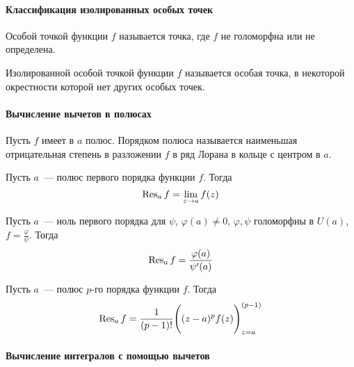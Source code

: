 \documentclass[12pt,timbord]{../../../notes}
\begin{document}
\paragraph{Классификация изолированных особых точек}
\label{par:tfcv::singclass}

\begin{defn}\label{defn:tfcv::singclass::sing}
  Особой точкой функции $f$ называется точка, где $f$ не голоморфна или не определена.
\end{defn}

\begin{defn}\label{defn:tfcv::singclass::isolsing}
  Изолированной особой точкой функции $f$ называется особая точка, в некоторой окрестности которой
  нет других особых точек.
\end{defn}

\setcounter{paragraph}{45}


\paragraph{Вычисление вычетов в полюсах}
\label{par:tfcv::resuduepole}

\begin{defn}\label{defn:tfcv::resuduepole::polord}
  Пусть $f$ имеет в $a$ полюс.
  Порядком полюса называется наименьшая отрицательная степень в разложении $f$ в ряд Лорана в
  кольце с центром в $a$.
\end{defn}

\begin{thrm}\label{thrm:tfcv::resuduepole::firt}
  Пусть $a$~--- полюс первого порядка функции $f$. Тогда
  \[
    \operatorname{Res}_a f =  \lim_{z\to a} f(z)
  \]
\end{thrm}
\begin{thrm}\label{thrm:tfcv::resuduepole::frac}
  Пусть $a$~--- ноль первого порядка для $\psi$, $\varphi(a) \neq 0$, $\varphi, \psi$ голоморфны в
  $U(a)$, $f = \frac{\varphi}{\psi}$. Тогда
  \[
    \operatorname{Res}_a f =  \frac{\varphi(a)}{\psi'(a)}
  \]
\end{thrm}

\begin{thrm}\label{thrm:tfcv::resuduepole::pirt}
  Пусть $a$~--- полюс $p$-го порядка функции $f$. Тогда
  \[
    \operatorname{Res}_a f =  \frac{1}{(p-1)!} \Biggl((z-a)^p f(z)\Biggr)^{(p-1)}_{z=a}
  \]
\end{thrm}

\paragraph{Вычисление интегралов с помощью вычетов}
\label{par:tfcv::intresidue}
\end{document}
